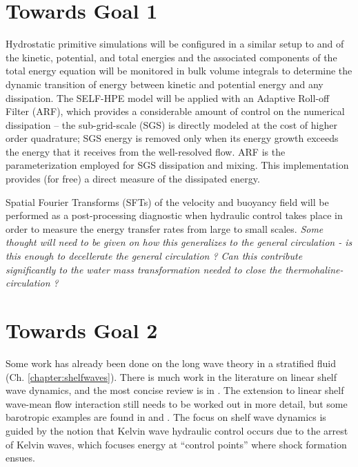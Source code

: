 \documentclass[12pt]{workjournal}
\begin{document}
 \section{Towards Goal 1}
 Hydrostatic primitive simulations will be configured in a similar setup to \citep{Dewar2010} and  of the kinetic, potential, and total energies and the associated components of the total energy equation will be monitored in bulk volume integrals to determine the dynamic transition of energy between kinetic and potential energy and any dissipation. The SELF-HPE model \citep{schoonoverSEM} will be applied with an Adaptive Roll-off Filter (ARF), which provides a considerable amount of control on the numerical dissipation -- the sub-grid-scale (SGS) is directly modeled at the cost of higher order quadrature; SGS energy is removed only when its energy growth exceeds the energy that it receives from the well-resolved flow. ARF is the parameterization employed for SGS dissipation and mixing. This implementation provides (for free) a direct measure of the dissipated energy. 
 
 Spatial Fourier Transforms (SFTs) of the velocity and buoyancy field will be performed as a post-processing diagnostic when hydraulic control takes place in order to measure the energy transfer rates from large to small scales. \textit{Some thought will need to be given on how this generalizes to the general circulation - is this enough to decellerate the general circulation ? Can this contribute significantly to the water mass transformation needed to close the thermohaline-circulation ?}
 
 \section{Towards Goal 2}
Some work has already been done on the long wave theory in a stratified fluid (Ch. \ref{chapter:shelfwaves}). There is much work in the literature on linear shelf wave dynamics, and the most concise review is in \citet{ChapmanRizzoli1989}. The extension to linear shelf wave-mean flow interaction still needs to be worked out in more detail, but some barotropic examples are found in \citet{Hughes1986} and \citet{Stern1998}. The focus on shelf wave dynamics is guided by the notion that Kelvin wave hydraulic control occurs due to the arrest of Kelvin waves, which focuses energy at ``control points'' where shock formation ensues.
\end{document}
